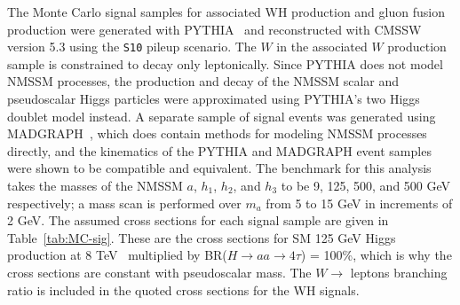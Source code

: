 The Monte Carlo signal samples for associated WH production and gluon fusion production were generated with PYTHIA~\cite{1126-6708-2006-05-026} and reconstructed with CMSSW version 5.3 using the \texttt{S10} pileup scenario. The $W$ in the associated $W$ production sample is constrained to decay only leptonically. Since PYTHIA does not model NMSSM processes, the production and decay of the NMSSM scalar and pseudoscalar Higgs particles were approximated using PYTHIA's two Higgs doublet model instead. A separate sample of signal events was generated using MADGRAPH~\cite{springerlink:10.1007/JHEP06(2011)128}, which does contain methods for modeling NMSSM processes directly, and the kinematics of the PYTHIA and MADGRAPH event samples were shown to be compatible and equivalent. The benchmark for this analysis takes the masses of the NMSSM $a$, $h_1$, $h_2$, and $h_3$ to be 9, 125, 500, and 500 GeV respectively; a mass scan is performed over $m_{a}$ from 5 to 15 GeV in increments of 2 GeV.  The assumed cross sections for each signal sample are given in Table~\ref{tab:MC-sig}.  These are the cross sections for SM 125 GeV Higgs production at 8 TeV~\cite{LHCHXSWG} multiplied by BR($H\rightarrow$$aa\rightarrow4\tau$) = 100\%, which is why the cross sections are constant with pseudoscalar mass.  The $W\rightarrow$ leptons branching ratio is included in the quoted cross sections for the WH signals.

